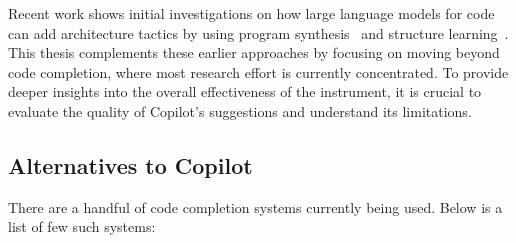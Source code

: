 Recent work shows initial investigations on how large language models for code can add architecture tactics by using program synthesis~\cite{Shokri2021, jigsaw} and structure learning~\cite{Karmakar2021}.
This thesis complements these earlier approaches by focusing on moving beyond code completion, where most research effort is currently concentrated.
To provide deeper insights into the overall effectiveness of the instrument, it is crucial to evaluate the quality of Copilot's suggestions and understand its limitations.

\subsection{Alternatives to Copilot}
There are a handful of code completion systems currently being used. Below is a list of few such systems:

